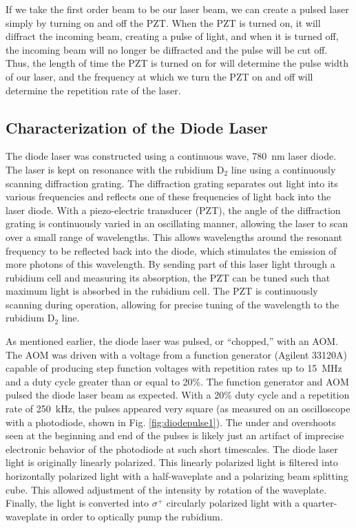 If we take the first order beam to be our laser beam, we can create a pulsed laser simply by turning on and off the PZT. When the PZT is turned on, it will diffract the incoming beam, creating a pulse of light, and when it is turned off, the incoming beam will no longer be diffracted and the pulse will be cut off. Thus, the length of time the PZT is turned on for will determine the pulse width of our laser, and the frequency at which we turn the PZT on and off will determine the repetition rate of the laser.


\subsection{Characterization of the Diode Laser}

The diode laser was constructed using a continuous wave, \SI{780}{\nano \meter} laser diode. The laser is kept on resonance with the rubidium D$_2$ line using a continuously scanning diffraction grating. The diffraction grating separates out light into its various frequencies and reflects one of these frequencies of light back into the laser diode. With a piezo-electric transducer (PZT), the angle of the diffraction grating is continuously varied in an oscillating manner, allowing the laser to scan over a small range of wavelengths. This allows wavelengths around the resonant frequency to be reflected back into the diode, which stimulates the emission of more photons of this wavelength. By sending part of this laser light through a rubidium cell and measuring its absorption, the PZT can be tuned such that maximum light is absorbed in the rubidium cell. The PZT is continuously scanning during operation, allowing for precise tuning of the wavelength to the rubidium D$_2$ line.

As mentioned earlier, the diode laser was pulsed, or ``chopped,'' with an AOM. The AOM was driven with a voltage from a function generator (Agilent 33120A) capable of producing step function voltages with repetition rates up to \SI{15}{\mega \hertz} and a duty cycle greater than or equal to 20\%. The function generator and AOM pulsed the diode laser beam as expected. With a 20\% duty cycle and a repetition rate of \SI{250}{ kHz}, the pulses appeared very square (as measured on an oscilloscope with a photodiode, shown in Fig. \ref{fig:diodepulse1}). The under and overshoots seen at the beginning and end of the pulses is likely just an artifact of imprecise electronic behavior of the photodiode at such short timescales. The diode laser light is originally linearly polarized. This linearly polarized light is filtered into horizontally polarized light with a half-waveplate and a polarizing beam splitting cube. This allowed adjustment of the intensity by rotation of the waveplate. Finally, the light is converted into $\sigma ^+$ circularly polarized light with a quarter-waveplate in order to optically pump the rubidium.

